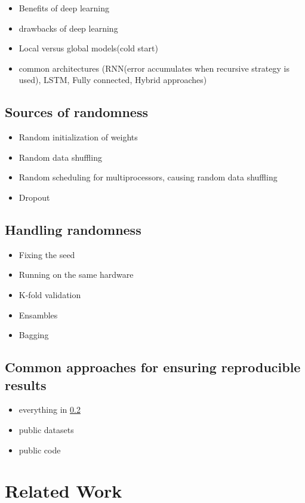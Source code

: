 \begin{itemize}
\item Benefits of deep learning
\item drawbacks of deep learning
\item Local versus global models(cold start)
\item common architectures (RNN(error accumulates when recursive strategy is used), LSTM, Fully connected, Hybrid approaches)
\end{itemize}
\subsection{Sources of randomness}
\begin{itemize}
\item Random initialization of weights
\item Random data shuffling
\item Random scheduling for multiprocessors, causing random data shuffling
\item Dropout
\end{itemize}
\subsection{Handling randomness}
\label{subsec:reproducibility}
\begin{itemize}
\item  Fixing the seed
\item Running on the same hardware
\item K-fold validation
\item Ensambles
\item Bagging
\end{itemize}
\subsection{Common approaches for ensuring reproducible results}
\begin{itemize}
\item everything in \ref{subsec:reproducibility}
\item public datasets
\item public code
\end{itemize}

\section{Related Work}
\label{subsec:related_work}
